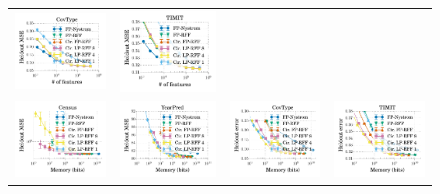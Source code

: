 \begin{figure}
\begin{tabular}{@{\hskip 0in}c@{\hskip 0in}c@{\hskip 0in}c@{\hskip 0in}c@{\hskip 0in}}
		\includegraphics[width=0.26\linewidth]{figures/covtype_error_vs_n_feat_all_line.pdf} &
		\includegraphics[width=0.26\linewidth]{figures/timit_error_vs_n_feat_all_line.pdf} \\
		\includegraphics[width=0.26\linewidth]{figures/census_MSE_vs_n_memory_all_line.pdf} &
		\includegraphics[width=0.26\linewidth]{figures/yearpred_MSE_vs_n_memory_all_line.pdf} &
		\includegraphics[width=0.26\linewidth]{figures/covtype_error_vs_n_memory_all_line.pdf} &
		\includegraphics[width=0.26\linewidth]{figures/timit_error_vs_n_memory_all_line.pdf} \\

\end{tabular}
\end{figure}
